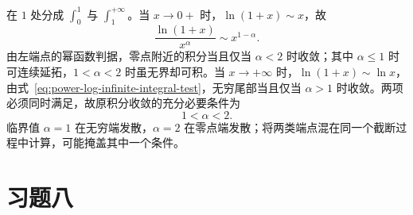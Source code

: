 \begin{solve}
在 $1$ 处分成 $\int_0^1$ 与 $\int_1^{+\infty}$。当 $x\to0+$ 时，$\ln(1+x)\sim x$，故
\[
    \frac{\ln(1+x)}{x^\alpha}\sim x^{1-\alpha}.
\]
由左端点的幂函数判据，零点附近的积分当且仅当 $\alpha<2$ 时收敛；其中 $\alpha\leq1$ 时可连续延拓，$1<\alpha<2$ 时虽无界却可积。当 $x\to+\infty$ 时，$\ln(1+x)\sim\ln x$，由式~\eqref{eq:power-log-infinite-integral-test}，无穷尾部当且仅当 $\alpha>1$ 时收敛。两项必须同时满足，故原积分收敛的充分必要条件为
\[
    1<\alpha<2.
\]
临界值 $\alpha=1$ 在无穷端发散，$\alpha=2$ 在零点端发散；将两类端点混在同一个截断过程中计算，可能掩盖其中一个条件。
\end{solve}

\section*{习题八}
